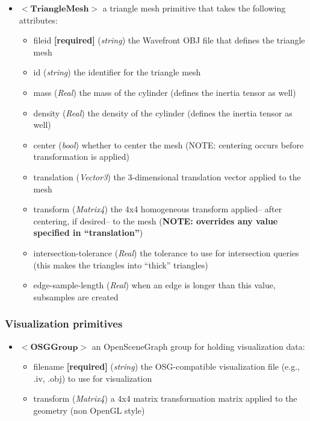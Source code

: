 \documentclass{article}
\begin{document}
\begin{landscape}
\begin{itemize}
\item $<\textbf{TriangleMesh}>$ a triangle mesh primitive that takes the following attributes:
\begin{itemize}
\item fileid \textbf{[required]} (\emph{string}) the Wavefront OBJ file that defines the triangle mesh
\item id  (\emph{string}) the identifier for the triangle mesh
\item mass (\emph{Real}) the mass of the cylinder (defines the inertia tensor as well)
\item density (\emph{Real})  the density of the cylinder  (defines the inertia tensor as well)
\item center (\emph{bool})  whether to center the mesh  (NOTE: centering occurs before transformation is applied)
\item translation (\emph{Vector3}) the 3-dimensional translation vector applied to the mesh 
\item transform (\emph{Matrix4}) the 4x4 homogeneous transform applied-- after centering, if desired-- to the mesh (\textbf{NOTE: overrides any value specified in ``translation''})
\item intersection-tolerance  (\emph{Real})  the tolerance to use for intersection queries (this makes the triangles into ``thick'' triangles)
\item edge-sample-length (\emph{Real}) when an edge is longer than this value, subsamples are created
\end{itemize}
\end{itemize}

\subsubsection{Visualization primitives}
\begin{itemize}
\item $<\textbf{OSGGroup}>$ an OpenSceneGraph group for holding visualization data:
\begin{itemize}
\item filename \textbf{[required]} (\emph{string}) the OSG-compatible visualization file (e.g., .iv, .obj) to use for visualization
\item transform (\emph{Matrix4}) a 4x4 matrix transformation matrix applied to the geometry (non OpenGL style)
\end{itemize}
\end{itemize}


\end{landscape}
\end{document}
